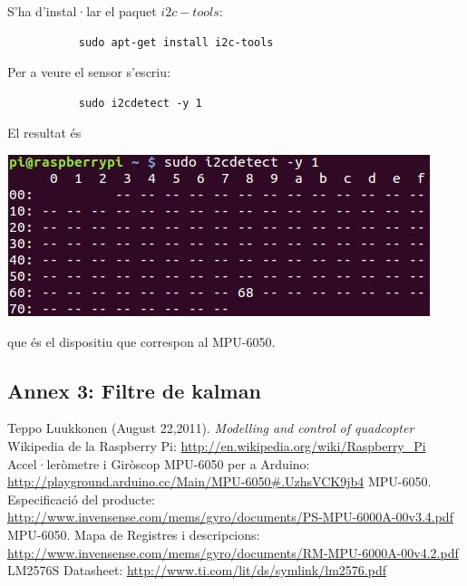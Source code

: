 \documentclass[twoside]{article}
\begin{document}
S'ha d'instal·lar el paquet $i2c-tools$:
\begin{verbatim}
           sudo apt-get install i2c-tools
\end{verbatim}
Per a veure el sensor s'escriu:
\begin{verbatim}
           sudo i2cdetect -y 1
\end{verbatim}
El resultat és 
\begin{center}
\includegraphics[scale=0.7]{images/i2cdetect.jpg}
\end{center}
que és el dispositiu que correspon al MPU-6050.
\newpage
\subsection*{Annex 3: Filtre de kalman}


\newpage
\begin{thebibliography}{99}
 Teppo Luukkonen (August 22,2011). \textit{Modelling and control of quadcopter}
 Wikipedia de la Raspberry Pi: \url{http://en.wikipedia.org/wiki/Raspberry_Pi}
 Accel·leròmetre i Giròscop MPU-6050 per a Arduino: \url{http://playground.arduino.cc/Main/MPU-6050#.UzhsVCK9jb4}
 MPU-6050. Especificació del producte: \url{http://www.invensense.com/mems/gyro/documents/PS-MPU-6000A-00v3.4.pdf}
 MPU-6050. Mapa de Registres i descripcions: \url{http://www.invensense.com/mems/gyro/documents/RM-MPU-6000A-00v4.2.pdf}
 LM2576S Datasheet: \url{http://www.ti.com/lit/ds/symlink/lm2576.pdf}
\end{thebibliography}{}
\end{document}
